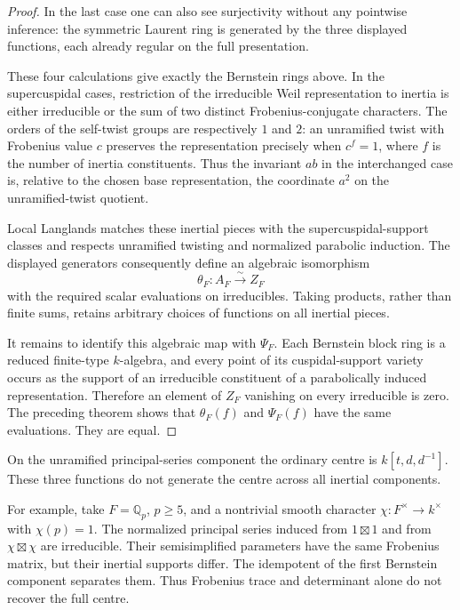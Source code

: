\begin{proof}
In the last case one can also see surjectivity without any
pointwise inference: the symmetric Laurent ring is generated
by the three displayed functions, each already regular on the
full presentation.

These four calculations give exactly the Bernstein
rings above. In the supercuspidal cases, restriction
of the irreducible Weil representation to inertia is
either irreducible or the sum of two distinct
Frobenius-conjugate characters. The orders of the
self-twist groups are respectively \(1\) and \(2\):
an unramified twist with Frobenius value \(c\)
preserves the representation precisely when \(c^f=1\),
where \(f\) is the number of inertia constituents.
Thus the invariant \(ab\) in the interchanged case is,
relative to the chosen base representation, the
coordinate \(a^2\) on the unramified-twist quotient.

Local Langlands matches these inertial pieces with
the supercuspidal-support classes and respects
unramified twisting and normalized parabolic
induction. The displayed generators consequently
define an algebraic isomorphism
\[
 \theta_F:A_F\xrightarrow{\sim} Z_F
\]
with the required scalar evaluations on irreducibles.
Taking products, rather than finite sums, retains
arbitrary choices of functions on all inertial pieces.

It remains to identify this algebraic map with
\(\Psi_F\). Each Bernstein block ring is a reduced
finite-type \(k\)-algebra, and every point of its
cuspidal-support variety occurs as the support of an
irreducible constituent of a parabolically induced
representation. Therefore an element of \(Z_F\)
vanishing on every irreducible is zero.
The preceding theorem shows that \(\theta_F(f)\) and
\(\Psi_F(f)\) have the same evaluations. They are equal.
\end{proof}

\begin{example}
\label{v4-arith:w10-e:ex:frobenius-insufficient}
On the unramified principal-series component the
ordinary centre is \(k[t,d,d^{-1}]\). These three
functions do not generate the centre across all
inertial components.

For example, take \(F=\mathbb Q_p\), \(p\geq5\), and a
nontrivial smooth character \(\chi:F^\times\to k^\times\)
with \(\chi(p)=1\). The normalized principal series
induced from \(1\boxtimes1\) and from
\(\chi\boxtimes\chi\) are irreducible. Their
semisimplified parameters have the same Frobenius
matrix, but their inertial supports differ.
The idempotent of the first Bernstein component
separates them. Thus Frobenius trace and determinant
alone do not recover the full centre.
\end{example}


